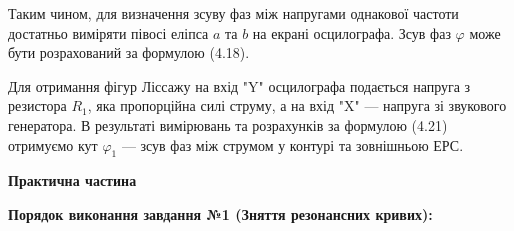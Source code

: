 \documentclass[12pt, a4paper]{article}
\begin{document}
    \vspace{0.5em}

    Таким чином, для визначення зсуву фаз між напругами однакової
    частоти достатньо виміряти півосі еліпса $a$ та $b$ на
    екрані осцилографа.
    Зсув фаз $\varphi$ може бути розрахований за формулою
    (4.18).

    Для отримання фігур Ліссажу на вхід "Y" осцилографа подається
    напруга з резистора $R_1$, яка пропорційна силі струму, а на вхід
    "X" --- напруга зі звукового генератора.
    В результаті вимірювань та розрахунків за формулою
    (4.21) отримуємо кут $\varphi_1$ --- зсув фаз між струмом у
    контурі та зовнішньою ЕРС.

    \newpage


    \setlength{\parindent}{0pt}

    \begin{center}
        \textbf{\Large Практична частина}
    \end{center}

    \textbf{Порядок виконання завдання №1 (Зняття резонансних кривих):}
\end{document}
